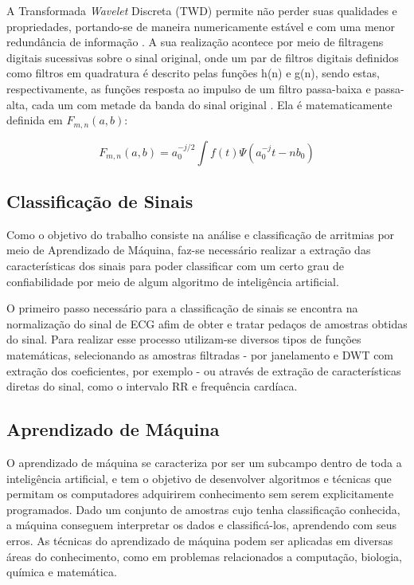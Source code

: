 \documentclass[conference]{IEEEtran}
\begin{document}
A Transformada \textit{Wavelet} Discreta (TWD) permite não perder suas qualidades e propriedades, portando-se de maneira numericamente estável e com uma menor redundância de informação \cite{silva06}. A sua realização acontece por meio de filtragens digitais sucessivas sobre o sinal
original, onde um par de filtros digitais definidos como filtros em quadratura é descrito pelas funções h(n) e g(n), sendo estas, respectivamente, as funções resposta ao impulso de um filtro passa-baixa e passa-alta, cada um com metade da banda do sinal original \cite{castelano06}. Ela é matematicamente definida em $F_{m,n}(a,b)$:

\[ 	F_{m,n}(a,b) = a_{0}^{-j/2}\int f(t)\Psi (a_{0}^{-j}t - nb_{0}) \]

\subsection{Classificação de Sinais}
Como o objetivo do trabalho consiste na análise e classificação de arritmias por meio de Aprendizado de Máquina, faz-se necessário realizar a extração das características dos sinais para poder classificar com um certo grau de confiabilidade por meio de algum algoritmo de inteligência artificial.

O primeiro passo necessário para a classificação de sinais se encontra na normalização do sinal de ECG afim de obter e tratar pedaços de amostras obtidas do sinal. Para realizar esse processo utilizam-se diversos tipos de funções matemáticas, selecionando as amostras filtradas - por janelamento e DWT com extração dos coeficientes, por exemplo - ou através de extração de características diretas do sinal, como o intervalo RR e frequência cardíaca.

\subsection{Aprendizado de Máquina}

O aprendizado de máquina se caracteriza por ser um subcampo dentro de toda a inteligência artificial, e tem o objetivo de desenvolver algoritmos e técnicas que permitam os computadores adquirirem conhecimento sem serem explicitamente programados. Dado um conjunto de amostras cujo tenha classificação conhecida, a máquina conseguem interpretar os dados e classificá-los, aprendendo com seus erros. \cite{morellato08}As técnicas do aprendizado de máquina podem ser aplicadas em diversas áreas do conhecimento, como em problemas relacionados a computação, biologia, química e matemática.\cite{morellato08}
\end{document}
